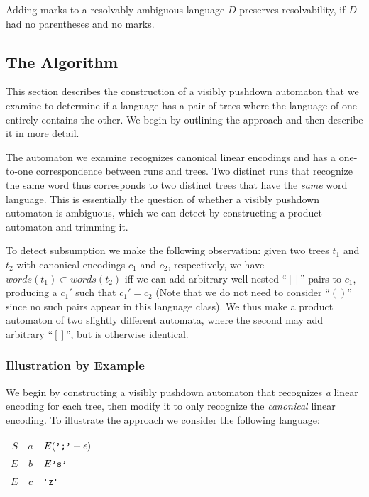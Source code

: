 \documentclass[runningheads]{llncs}
\newcommand{\words}{\mathit{words}} %
\newcommand{\reqpl}{(}
\newcommand{\reqpr}{)}
\newcommand{\reqp}[1]{\reqpl#1\reqpr}
\newcommand{\pospl}{[}
\newcommand{\pospr}{]}
\newcommand{\posp}[1]{\pospl#1\pospr}
\begin{document}
\begin{theorem}
  Adding marks to a resolvably ambiguous language $D$ preserves resolvability, if $D$ had no parentheses and no marks.
\end{theorem}

\subsection{The Algorithm} \label{sec:lattice-vpl}

This section describes the construction of a visibly pushdown automaton that we examine to determine if a language has a pair of trees where the language of one entirely contains the other. We begin by outlining the approach and then describe it in more detail.

The automaton we examine recognizes canonical linear encodings and has a one-to-one correspondence between runs and trees. Two distinct runs that recognize the same word thus corresponds to two distinct trees that have the \emph{same} word language. This is essentially the question of whether a visibly pushdown automaton is ambiguous, which we can detect by constructing a product automaton and trimming it.

To detect subsumption we make the following observation: given two trees $t_1$ and $t_2$ with canonical encodings $c_1$ and $c_2$, respectively, we have $\words(t_1) \subset \words(t_2)$ iff we can add arbitrary well-nested ``$\posp{}$'' pairs to $c_1$, producing a $c_1'$ such that $c_1' = c_2$ (Note that we do not need to consider ``$\reqp{}$'' since no such pairs appear in this language class). We thus make a product automaton of two slightly different automata, where the second may add arbitrary ``$\posp{}$'', but is otherwise identical.

\subsubsection{Illustration by Example}

We begin by constructing a visibly pushdown automaton that recognizes \emph{a} linear encoding for each tree, then modify it to only recognize the \emph{canonical} linear encoding. To illustrate the approach we consider the following language:

\begin{center}
  \begin{tabular}{@{}r@{$\;->\;$}c@{\,:\;}l}
    \toprule
    $S$ & $a$ & $E(\verb|';'| + \epsilon)$ \\
    $E$ & $b$ & $E\verb|'s'|$ \\
    $E$ & $c$ & \verb|'z'| \\
    \bottomrule
  \end{tabular}
\end{center}
\end{document}
